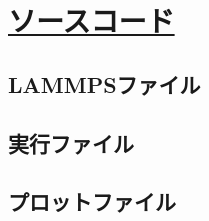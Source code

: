 \chapter{\href{https://github.com/m-agnet/Report.git}{ソースコード}}

\section{LAMMPSファイル}


\section{実行ファイル}



\section{プロットファイル}

